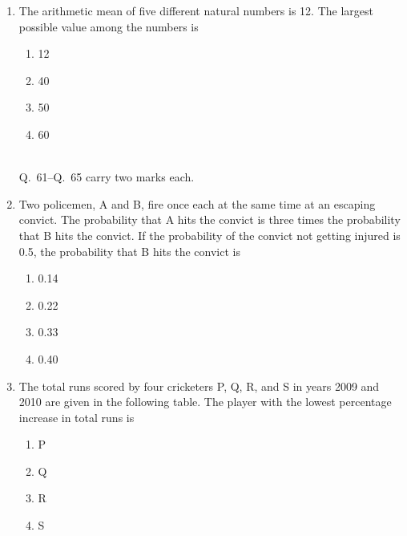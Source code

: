 \documentclass[journal]{IEEEtran}
\begin{document}
\begin{enumerate}[leftmargin=0pt]
\item The arithmetic mean of five different natural numbers is 12. The largest possible value among the numbers is
\begin{multicols}{2}
\begin{enumerate}[label=(\Alph*), itemsep=0pt, topsep=2pt]
  \item 12
  \item 40
  \item 50
  \item 60
\end{enumerate}
\end{multicols}
\hfill{}\\[0.5em]
\noindent Q.\ 61--Q.\ 65 carry two marks each.

\item Two policemen, A and B, fire once each at the same time at an escaping convict. The probability that A hits the convict is three times the probability that B hits the convict. If the probability of the convict not getting injured is 0.5, the probability that B hits the convict is
\begin{multicols}{2}
\begin{enumerate}[label=(\Alph*), itemsep=0pt, topsep=2pt]
  \item 0.14
  \item 0.22
  \item 0.33
  \item 0.40
\end{enumerate}
\end{multicols}
\hfill{}

\item The total runs scored by four cricketers P, Q, R, and S in years 2009 and 2010 are given in the following table. The player with the lowest percentage increase in total runs is


\begin{multicols}{2}
\begin{enumerate}[label=(\Alph*), itemsep=0pt, topsep=2pt]
  \item P
  \item Q
  \item R
  \item S
\end{enumerate}
\end{multicols}
\hfill{}



\end{enumerate}
\end{document}

